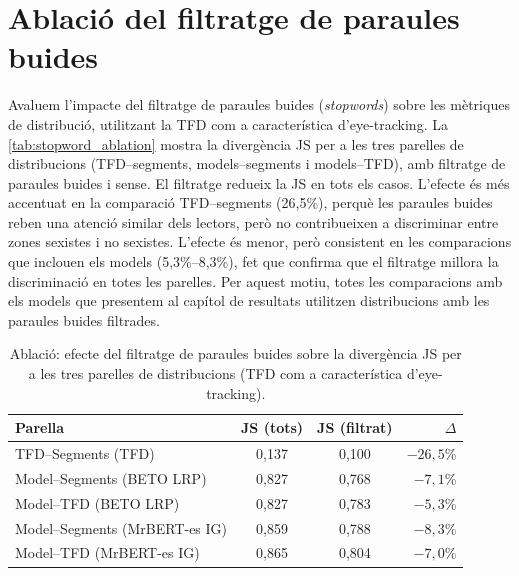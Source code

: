 \chapter{Ablació del filtratge de paraules buides}\label{sec:stopword_ablation}

Avaluem l'impacte del filtratge de paraules buides (\textit{stopwords}) sobre les mètriques de distribució, utilitzant la TFD com a característica d'eye-tracking.
La \autoref{tab:stopword_ablation} mostra la divergència JS per a les tres parelles de distribucions (TFD--segments, models--segments i models--TFD), amb filtratge de paraules buides i sense.
El filtratge redueix la JS en tots els casos. L'efecte és més accentuat en la comparació TFD--segments (26,5\%), perquè les paraules buides reben una atenció similar dels lectors, però no contribueixen a discriminar entre zones sexistes i no sexistes.
L'efecte és menor, però consistent en les comparacions que inclouen els models (5,3\%--8,3\%), fet que confirma que el filtratge millora la discriminació en totes les parelles.
Per aquest motiu, totes les comparacions amb els models que presentem al capítol de resultats utilitzen distribucions amb les paraules buides filtrades.
\iftables
\begin{table}[htbp]
\small
\centering
\begin{tabular}{lccr}
\toprule
\textbf{Parella} & \textbf{JS (tots)} & \textbf{JS (filtrat)} & \textbf{$\Delta$} \\
\midrule
TFD–Segments (TFD)               & 0,137 & 0,100 & $-26,5$\% \\
Model–Segments (BETO LRP)      & 0,827 & 0,768 & $-7,1$\% \\
Model–TFD (BETO LRP)           & 0,827 & 0,783 & $-5,3$\% \\
Model–Segments (MrBERT-es IG)     & 0,859 & 0,788 & $-8,3$\% \\
Model–TFD (MrBERT-es IG)          & 0,865 & 0,804 & $-7,0$\% \\
\bottomrule
\end{tabular}
\caption{Ablació: efecte del filtratge de paraules buides sobre la divergència JS per a les tres parelles de distribucions (TFD com a característica d'eye-tracking).}
\label{tab:stopword_ablation}
\end{table}
\fi
